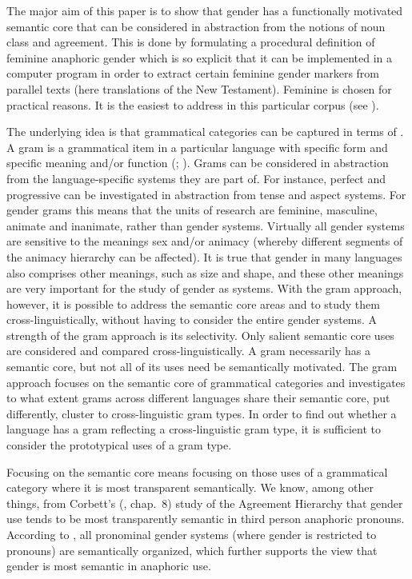 \documentclass[output=collectionpaper]{langsci/langscibook}
\begin{document}
The major aim of this paper is to show that gender has a functionally motivated semantic core that can be considered in abstraction from the notions of noun class and agreement. This is done by formulating a procedural definition of feminine anaphoric gender which is so explicit that it can be implemented in a computer program in order to extract certain feminine gender markers from parallel texts (here translations of the New Testament). Feminine is chosen for practical reasons. It is the easiest to address in this particular corpus (see ).

The underlying idea is that grammatical categories can be captured in terms of . A gram is a grammatical item in a particular language with specific form and specific meaning and/or function (\citealt{Bybee1989}; \citealt{Dahl2016}). Grams can be considered in abstraction from the language-specific systems they are part of. For instance, perfect and progressive can be investigated in abstraction from tense and aspect systems. For gender grams this means that the units of research are feminine, masculine, animate and inanimate, rather than gender systems. Virtually all gender systems are sensitive to the meanings sex and/or animacy (whereby different segments of the animacy hierarchy can be affected). It is true that gender in many languages also comprises other meanings, such as size and shape, and these other meanings are very important for the study of gender as systems. With the gram approach, however, it is possible to address the semantic core areas and to study them cross-linguistically, without having to consider the entire gender systems. A strength of the gram approach is its selectivity. Only salient semantic core uses are considered and compared cross-linguistically. A gram necessarily has a semantic core, but not all of its uses need be semantically motivated. The gram approach focuses on the semantic core of grammatical categories and investigates to what extent grams across different languages share their semantic core, put differently, cluster to cross-linguistic gram types. In order to find out whether a language has a gram reflecting a cross-linguistic gram type, it is sufficient to consider the prototypical uses of a gram type.

Focusing on the semantic core means focusing on those uses of a grammatical category where it is most transparent semantically. We know, among other things, from Corbett’s (\citeyear{Corbett1991}, chap.~8) study of the Agreement Hierarchy that gender use tends to be most transparently semantic in third person anaphoric pronouns. According to \citet{Audring2009a}, all pronominal gender systems (where gender is restricted to pronouns) are semantically organized, which further supports the view that gender is most semantic in anaphoric use.
\end{document}
